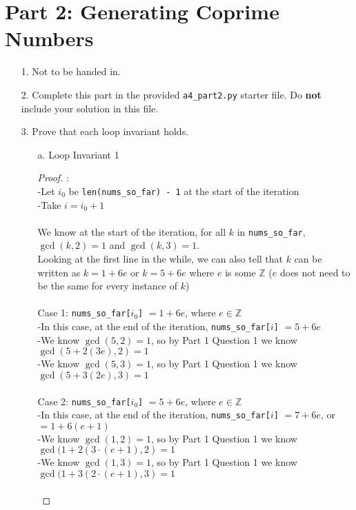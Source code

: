 \documentclass[fontsize=11pt]{article}
\newcommand{\Z}{\mathbb{Z}}
\begin{document}
\newpage

\section*{Part 2: Generating Coprime Numbers}

\begin{enumerate}

\item[1.]
Not to be handed in.

\item[2.]
Complete this part in the provided \texttt{a4\_part2.py} starter file.
Do \textbf{not} include your solution in this file.

\item[3.]
Prove that each loop invariant holds.

\begin{enumerate}
\item[a.] Loop Invariant 1
\begin{proof}
: \\-Let $i_0$ be \texttt{len(nums\_so\_far) - 1} at the start of the iteration \\
-Take $i = i_0 + 1$ \\~\\
We know at the start of the iteration, for all $k$ in \texttt{nums\_so\_far}, $\gcd(k, 2) = 1$ and $\gcd(k, 3) = 1$. \\
Looking at the first line in the while, we can also tell that $k$ can be written as $k = 1 + 6e$ or $k = 5 + 6e$ where $e$ is some $\Z$ ($e$ does not need to be the same for every instance of $k$) \\~\\
Case 1: \texttt{nums\_so\_far[$i_0$]} $= 1 + 6e$, where $ e \in \Z$ \\
-In this case, at the end of the iteration, \texttt{nums\_so\_far[$i$]} $= 5 + 6e$ \\
-We know $\gcd(5, 2) = 1$, so by Part 1 Question 1 we know $\gcd(5 + 2(3e), 2) = 1 $ \\
-We know $\gcd(5, 3) = 1$, so by Part 1 Question 1 we know $\gcd(5 + 3(2e), 3) = 1 $ \\~\\

Case 2: \texttt{nums\_so\_far[$i_0$]} $= 5 + 6e$, where $ e \in \Z$ \\
-In this case, at the end of the iteration, \texttt{nums\_so\_far[$i$]} $= 7 + 6e$, or $= 1 + 6(e + 1)$  \\
-We know $\gcd(1, 2) = 1$, so by Part 1 Question 1 we know $\gcd(1 + 2(3 \cdot (e + 1), 2) = 1 $ \\
-We know $\gcd(1, 3) = 1$, so by Part 1 Question 1 we know $\gcd(1 + 3(2 \cdot (e + 1), 3) = 1 $ \\~\\


\end{proof}
\end{enumerate}
\end{enumerate}
\end{document}

